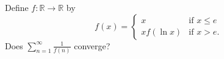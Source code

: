 Define $f: \mathbb{R} \to \mathbb{R}$ by
\[
f(x) = \begin{cases} x & \mbox{if $x \leq e$} \\ x f(\ln x) &
\mbox{if $x > e$.} \end{cases}
\]
Does $\sum_{n=1}^\infty \frac{1}{f(n)}$ converge?
